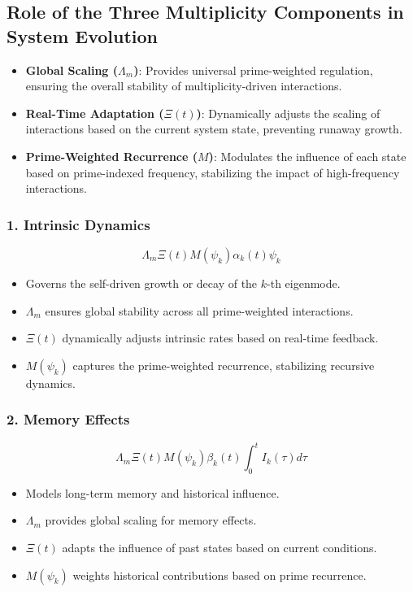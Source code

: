 \documentclass[12pt]{article}
\theoremstyle{plain}
\begin{document}
\subsection{Role of the Three Multiplicity Components in System Evolution}

\begin{itemize}
    \item \textbf{Global Scaling (\(\Lambda_m\))}: Provides universal prime-weighted regulation, ensuring the overall stability of multiplicity-driven interactions.
    \item \textbf{Real-Time Adaptation (\(\Xi(t)\))}: Dynamically adjusts the scaling of interactions based on the current system state, preventing runaway growth.
    \item \textbf{Prime-Weighted Recurrence (\(M\))}: Modulates the influence of each state based on prime-indexed frequency, stabilizing the impact of high-frequency interactions.
\end{itemize}

\subsubsection{1. Intrinsic Dynamics}

\[
\Lambda_m \Xi(t) M(\psi_k) \alpha_k(t) \psi_k
\]

\begin{itemize}
    \item Governs the self-driven growth or decay of the \( k \)-th eigenmode.
    \item \(\Lambda_m\) ensures global stability across all prime-weighted interactions.
    \item \(\Xi(t)\) dynamically adjusts intrinsic rates based on real-time feedback.
    \item \(M(\psi_k)\) captures the prime-weighted recurrence, stabilizing recursive dynamics.
\end{itemize}

\subsubsection{2. Memory Effects}

\[
\Lambda_m \Xi(t) M(\psi_k) \beta_k(t) \int_0^t I_k(\tau) d\tau
\]

\begin{itemize}
    \item Models long-term memory and historical influence.
    \item \(\Lambda_m\) provides global scaling for memory effects.
    \item \(\Xi(t)\) adapts the influence of past states based on current conditions.
    \item \(M(\psi_k)\) weights historical contributions based on prime recurrence.
\end{itemize}
\end{document}
